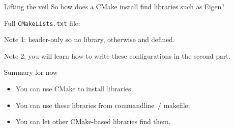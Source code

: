 \begin{numberedframe}{Lifting the veil}
  So how does a CMake install find libraries such as Eigen?

  Full \lstinline{CMakeLists.txt} file:
  
  \lstset{numbers=left,numberstyle=\tiny}
  
  Note 1: header-only so no library, otherwise
   and  defined.

  Note 2: you will learn how to write these configurations
  in the second part.
\end{numberedframe}

\begin{numberedframe}{Summary for now}
  \begin{itemize}
  \item You can use CMake to install libraries;
  \item You can use these libraries from commandline~/ makefile;
  \item You can let other CMake-based libraries find them.
  \end{itemize}
\end{numberedframe}

\endinput

\begin{numberedframe}{OpenMP from Fortran}
\begin{lstlisting}
\end{lstlisting}
\end{numberedframe}

\begin{numberedframe}{OpenMP from Fortran}
\begin{lstlisting}
\end{lstlisting}
\end{numberedframe}

